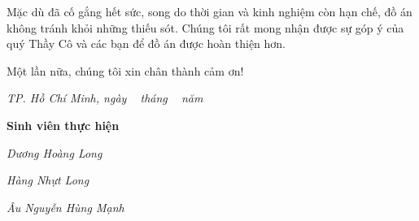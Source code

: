 Mặc dù đã cố gắng hết sức, song do thời gian và kinh nghiệm còn hạn chế, đồ án không tránh khỏi những thiếu sót. Chúng tôi rất mong nhận được sự góp ý của quý Thầy Cô và các bạn để đồ án được hoàn thiện hơn.

Một lần nữa, chúng tôi xin chân thành cảm ơn!

\newpage
\thispagestyle{empty}
\begin{flushright}
\textit{TP. Hồ Chí Minh, ngày \ngay~ tháng \thang~ năm \nam}

\vspace{1.5cm}
\par\hfill\textbf{Sinh viên thực hiện}\hspace{1cm}
\par\hfill\textit{Dương Hoàng Long}
\par\hfill\textit{Hàng Nhựt Long}\hspace{0.3cm}
\par\hfill\textit{Âu Nguyễn Hùng Mạnh}\hspace{0.2cm}
\end{flushright}

\newpage
